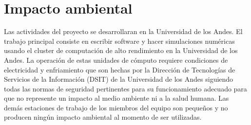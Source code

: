 
\section{Impacto ambiental}

Las actividades del proyecto se desarrollaran en la Universidad de los
Andes. El trabajo principal consiste en escribir software y hacer
simulaciones num\'ericas usando el cluster de computaci\'on de alto
rendimiento en la Universidad de los Andes.
 La operaci\'on de estas unidades de c\'omputo  requiere condiciones de electricidad y enfriamiento que son hechas por la Direcci\'on  de Tecnolog\'ias de 
Servicios de la Informaci\'on (DSIT) de la Universidad de los Andes
siguiendo todas las normas de seguridad pertinentes para su
funcionamiento adecuado para que no represente un impacto al medio
ambiente ni a la salud humana. Las dem\'as estaciones de trabajo de
los miembros del equipo son peque\~nos y no producen ning\'un impacto
ambiental al momento de ser utilizadas. 
